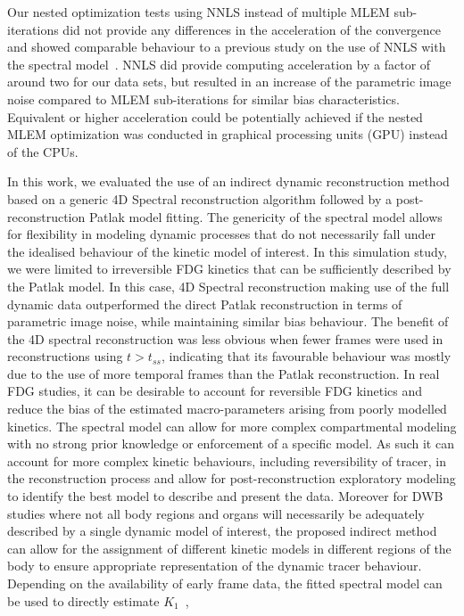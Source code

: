 Our nested optimization tests using NNLS instead of multiple MLEM sub-iterations did not provide any differences in the acceleration of the convergence and showed comparable behaviour to a previous study on the use of NNLS with the spectral model~\cite{Matthews2010}. 
NNLS did provide computing acceleration by a factor of around two for our data sets, but resulted in an increase of the parametric image noise compared to MLEM sub-iterations for similar bias characteristics.
Equivalent or higher acceleration could be potentially achieved if the nested MLEM optimization was conducted in graphical processing units (GPU) instead of the CPUs.

In this work, we evaluated the use of an indirect dynamic reconstruction method based on a generic 4D Spectral reconstruction algorithm followed by a post-reconstruction Patlak model fitting. 
The genericity of the spectral model allows for flexibility in modeling dynamic processes that do not necessarily fall under the idealised behaviour of the kinetic model of interest.
In this simulation study, we were limited to irreversible FDG kinetics that can be sufficiently described by the Patlak model. 
In this case, 4D Spectral reconstruction making use of the full dynamic data outperformed the direct Patlak reconstruction in terms of parametric image noise, while maintaining similar bias behaviour. 
The benefit of the 4D spectral reconstruction was less obvious when fewer frames were used in reconstructions using $t>t_{ss}$, indicating that its favourable behaviour was mostly due to the use of more temporal frames than the Patlak reconstruction.
In real FDG studies, it can be desirable to account for reversible FDG kinetics and reduce the bias of the estimated macro-parameters arising from poorly modelled kinetics. 
The spectral model can allow for more complex compartmental modeling with no strong prior knowledge or enforcement of a specific model. 
As such it can account for more complex kinetic behaviours, including reversibility of tracer, in the reconstruction process 
and allow for post-reconstruction exploratory modeling to identify the best model to describe and present the data. 
Moreover for DWB studies where not all body regions and organs will necessarily be adequately described by a single dynamic model of interest, 
the proposed indirect method can allow for the assignment of different kinetic models in different regions of the body to ensure appropriate representation of the dynamic tracer behaviour.
Depending on the availability of early frame data, the fitted spectral model can be used to directly estimate $K_1$~\cite{Meikle1998,Matthews2010}, 
